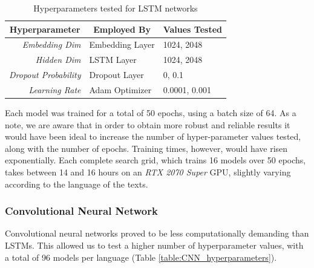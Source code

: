 \documentclass[letterpaper,11pt]{article}
\begin{document}
\begin{table}[H]
  \centering
  \begin{tabular}{@{}rll@{}}
  \toprule
  \multicolumn{1}{c}{\textbf{Hyperparameter}} & \multicolumn{1}{c}{\textbf{Employed By}} & \textbf{Values Tested} \\ \midrule
  \textit{Embedding Dim}                               & Embedding Layer                          & 1024, 2048          \\
  \textit{Hidden Dim}                                  & LSTM Layer                               & 1024, 2048          \\
  \textit{Dropout Probability}                         & Dropout Layer                            & 0, 0.1              \\
  \textit{Learning Rate}                               & Adam Optimizer                           & 0.0001, 0.001       \\ \bottomrule
\end{tabular}
\caption{Hyperparameters tested for LSTM networks}
\label{table:LSTM_hyperparameters}
\end{table}

Each model was trained for a total of 50 epochs, using a batch size of 64. As a note, we are aware that in order to obtain more robust and reliable results it would have been ideal to increase the number of hyper-parameter values tested, along with the number of epochs. Training times, however, would have risen exponentially. Each complete search grid, which trains 16 models over 50 epochs, takes between 14 and 16 hours on an \textit{RTX 2070 Super} GPU, slightly varying according to the language of the texts.

\subsubsection*{Convolutional Neural Network}

Convolutional neural networks proved to be less computationally demanding than LSTMs. This allowed us to test a higher number of hyperparameter values, with a total of 96 models per language (Table \ref{table:CNN_hyperparameters}).
\end{document}
